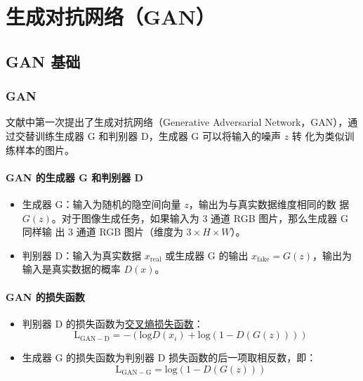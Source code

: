 \part{生成对抗网络（GAN）}

\chapter{GAN 基础}
\section{GAN}

文献中第一次提出了生成对抗网络（Generative Adversarial
Network，GAN），通过交替训练生成器 G 和判别器 D，生成器 G 可以将输入的噪声 $z$ 转
化为类似训练样本的图片。

\subsection{GAN 的生成器 G 和判别器 D}

\begin{itemize}
  \item 生成器 G：输入为随机的隐空间向量 $z$，输出为与真实数据维度相同的数
    据 $G(z)$。对于图像生成任务，如果输入为 3 通道 RGB 图片，那么生成器 G 同样输
    出 3 通道 RGB 图片（维度为 $3 \times H \times W$）。
  \item 判别器 D：输入为真实数据 $x_{\mathrm{real}}$ 或生成器 G 的输出
    $x_{\mathrm{fake}} = G(z)$，输出为输入是真实数据的概率 $D(x)$。
\end{itemize}

\subsection{GAN 的损失函数}

\begin{itemize}
  \item 判别器 D 的损失函数为\hyperref[subsec:CELoss]{交叉熵损失函数}：
  \begin{equation}
    \label{equ:GAN-D}
    \mathrm{L}_{\mathrm{GAN-D}} = - \left( \mathrm{log} D(x_i) + \mathrm{log} (1-D(G(z))) \right )
  \end{equation}

  \item 生成器 G 的损失函数为判别器 D 损失函数的后一项取相反数，即：
  \begin{equation}
    \label{equ:GAN-G}
    \mathrm{L}_{\mathrm{GAN-G}} =  \mathrm{log} (1-D(G(z)))
  \end{equation}
\end{itemize}

